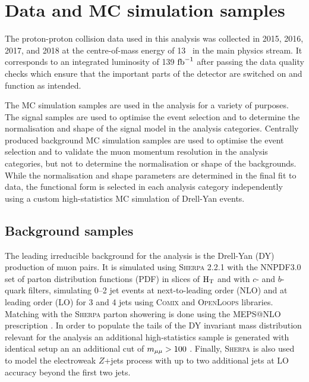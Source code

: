 \section{Data and MC simulation samples}

The proton-proton collision data used in this analysis was
collected in 2015, 2016, 2017, and 2018 at the centre-of-mass
energy of 13 \TeV~in the main physics stream. It corresponds
to an integrated luminosity of 139 $\text{fb}^{-1}$ after passing the data
quality checks which ensure that the important parts of the
detector are switched on and function as intended.

The MC simulation samples are used in the analysis for a 
variety of purposes. The signal samples are used to optimise
the event selection and to determine the normalisation and
shape of the signal model in the analysis categories.
Centrally produced background MC simulation samples are used
to optimise the event selection and to validate the muon
momentum resolution in the analysis categories, but not to
determine the normalisation or shape of the backgrounds.
While the normalisation and shape parameters are determined
in the final fit to data, the functional form is selected
in each analysis category independently using a custom
high-statistics MC simulation of Drell-Yan events.

\subsection{Background samples}

\label{sec:bkg-mc}

The leading irreducible background for the analysis is the
Drell-Yan (DY) production of muon pairs. It is simulated using
\textsc{Sherpa} 2.2.1 with the NNPDF3.0 set of parton
distribution functions (PDF) \cite{Ball:2014uwa} in slices of
$\text{H}_\text{T}$ and with $c$- and $b$-quark filters, simulating 0--2
jet events at next-to-leading order (NLO) and at leading order
(LO) for 3 and 4 jets using \textsc{Comix} \cite{Gleisberg:2008fv}
and \textsc{OpenLoops} \cite{Cascioli:2011va, Denner:2016kdg}
libraries. Matching with the \textsc{Sherpa} parton showering
\cite{Schumann:2007mg} is done using the MEPS@NLO prescription
\cite{Catani:2001cc, Hoeche:2012yf, Hoeche:2011fd}.
In order to populate the tails of the
DY invariant mass distribution relevant for the analysis an
additional high-statistics sample is generated with identical
setup an an additional cut of $m_{\mu\mu} > 100$ \GeV. Finally, 
\textsc{Sherpa} is also used to model the electroweak $Z$+jets
process with up to two additional jets at LO accuracy beyond
the first two jets.

